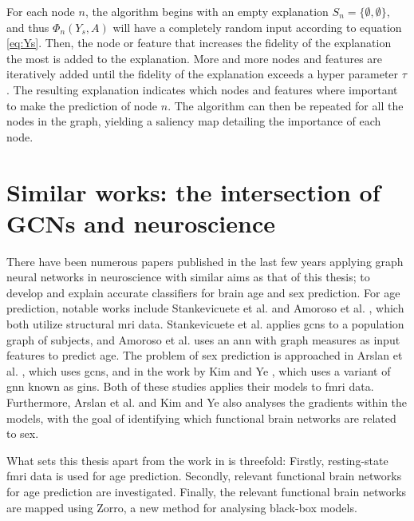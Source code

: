 For each node $n$, the algorithm begins with an empty explanation $S_n = \{\emptyset, \emptyset\}$, and thus $\Phi_n(Y_s, A)$ will have a completely random input according to equation \ref{eq:Ys}. Then, the node or feature that increases the fidelity of the explanation the most is added to the explanation. More and more nodes and features are iteratively added until the fidelity of the explanation exceeds a hyper parameter $\tau$. The resulting explanation indicates which nodes and features where important to make the prediction of node $n$. The algorithm can then be repeated for all the nodes in the graph, yielding a saliency map detailing the importance of each node.

\section{Similar works: the intersection of GCNs and neuroscience}


There have been numerous papers published in the last few years applying graph neural networks in neuroscience with similar aims as that of this thesis; to develop and explain accurate classifiers for brain age and sex prediction. For age prediction, notable works include Stankevicuete et al. \cite{stankeviciute} and Amoroso et al. \cite{amoroso_multiplex_age}, which both utilize structural \acrshort{mri} data. Stankevicuete et al. applies \acrshort{gcn}s to a population graph of subjects, and Amoroso et al. uses an \acrshort{ann} with graph measures as input features to predict age. The problem of sex prediction is approached in Arslan et al. \cite{arslan}, which uses \acrshort{gcn}s, and in the work by Kim and Ye \cite{understanding_gnn}, which uses a variant of \acrshort{gnn} known as \acrshort{gin}s. Both of these studies applies their models to \acrshort{fmri} data. Furthermore, Arslan et al. and Kim and Ye also analyses the gradients within the models, with the goal of identifying which functional brain networks are related to sex. 

What sets this thesis apart from the work in \cite{stankeviciute, amoroso_multiplex_age, arslan, understanding_gnn} is threefold: Firstly, resting-state \acrshort{fmri} data is used for age prediction. Secondly, relevant functional brain networks for age prediction are investigated. Finally, the relevant functional brain networks are mapped using Zorro, a new method for analysing black-box models.

